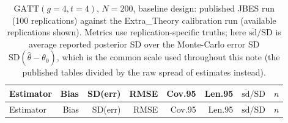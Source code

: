 {\footnotesize
\begin{longtable}{lrrrrrrr}
\caption{$\mathrm{GATT}(g{=}4,t{=}4)$, $N=200$, baseline design: published JBES run (100 replications) against the Extra\_Theory calibration run (available replications shown). Metrics use replication-specific truths; here $\overline{\mathrm{sd}}/\mathrm{SD}$ is average reported posterior SD over the Monte-Carlo error SD $\mathrm{SD}(\widehat\theta-\theta_0)$, which is the common scale used throughout this note (the published tables divided by the raw spread of estimates instead).}\label{tab:repro_baseline}\\
\toprule
Estimator & Bias & SD(err) & RMSE & Cov.95 & Len.95 & $\overline{\mathrm{sd}}/\mathrm{SD}$ & $n$ \\
\midrule

\endfirsthead
\toprule
Estimator & Bias & SD(err) & RMSE & Cov.95 & Len.95 & $\overline{\mathrm{sd}}/\mathrm{SD}$ & $n$ \\
\midrule


\end{longtable}}
